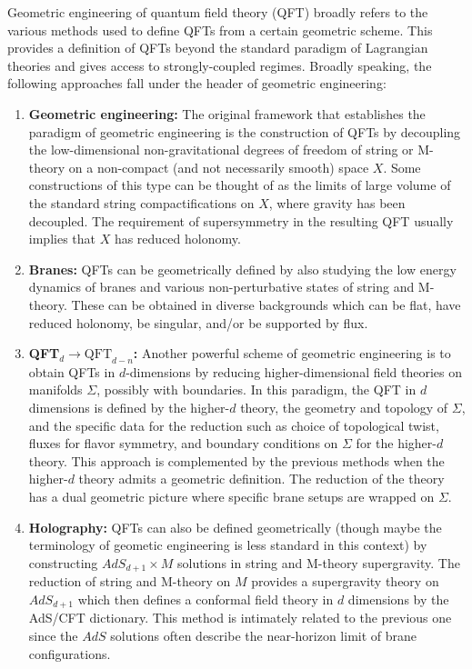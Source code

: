 \documentclass[12pt]{article}
\begin{document}
Geometric engineering of quantum field theory (QFT) broadly refers to the various methods used to define QFTs from a 
certain geometric scheme. This provides a definition of QFTs beyond the standard paradigm of Lagrangian theories and gives access to strongly-coupled regimes. Broadly speaking, the following approaches fall under the header of geometric engineering: 
\begin{enumerate}
    \item {\bf Geometric engineering:} The original framework that establishes the paradigm of geometric engineering is the construction of QFTs by decoupling the low-dimensional non-gravitational degrees of freedom of string or M-theory on a non-compact (and not necessarily smooth) space $X$. Some constructions of this type can be thought of as the limits of large volume  of the standard string compactifications on $X$, where gravity has been decoupled. 
    The requirement of supersymmetry in the resulting QFT usually implies that $X$ has reduced holonomy. 
    \item {\bf Branes:} QFTs can be geometrically defined by also studying the low energy dynamics of branes and various non-perturbative states of string and M-theory.  These can be obtained in diverse backgrounds which can be flat, have reduced holonomy, be singular, and/or be supported by flux.  
    \item {\bf QFT$_d \rightarrow {\text{QFT}_{d-n}}$:} Another powerful scheme of geometric engineering is to obtain QFTs in $d$-dimensions by reducing higher-dimensional field theories on manifolds $\Sigma$, possibly with boundaries.  In this paradigm, the QFT in $d$ dimensions is defined by the higher-$d$ theory, the geometry and topology of $\Sigma$, and the specific data for the reduction such as choice of topological twist, fluxes for flavor symmetry, and boundary conditions on $\Sigma$ for the higher-$d$ theory.  This approach is complemented by the previous methods when the higher-$d$ theory admits a geometric definition.  The reduction of the theory has a dual geometric picture where specific brane setups are wrapped on $\Sigma$.  
     \item {\bf Holography:} QFTs can also be defined geometrically (though maybe the terminology of geometic engineering is less standard in this context) by constructing $AdS_{d+1} \times M$ solutions in string and M-theory supergravity.  The reduction of string and M-theory on $M$ provides a supergravity theory on $AdS_{d+1}$ which then defines a conformal field theory in $d$ dimensions by the AdS/CFT dictionary.  This method is intimately related to the previous one since the $AdS$ solutions often describe the near-horizon limit of brane configurations.  
\end{enumerate}
\end{document}
